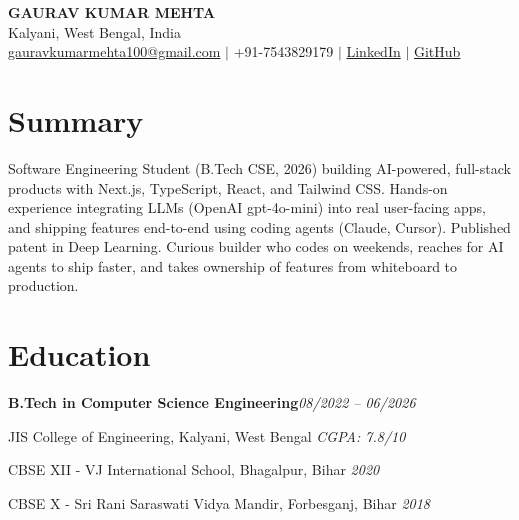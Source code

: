 \documentclass[a4paper,10pt]{article}
\newcommand{\role}[2]{%
  \noindent\textbf{#1}\hfill\textit{\small #2}\par\vspace{1pt}
}
\begin{document}
\begin{center}
    {\LARGE \textbf{GAURAV KUMAR MEHTA}}\\[2pt]
    {\small Kalyani, West Bengal, India}\\[2pt]
    {\small \href{mailto:gauravkumarmehta100@gmail.com}{gauravkumarmehta100@gmail.com} $\vert$
    +91-7543829179 $\vert$
    \href{https://www.linkedin.com/in/gauravkumarmehta}{LinkedIn} $\vert$
    \href{https://github.com/gaurav620}{GitHub}}
\end{center}

\section*{Summary}
Software Engineering Student (B.Tech CSE, 2026) building AI-powered, full-stack products with Next.js, TypeScript, React, and Tailwind CSS. Hands-on experience integrating LLMs (OpenAI gpt-4o-mini) into real user-facing apps, and shipping features end-to-end using coding agents (Claude, Cursor). Published patent in Deep Learning. Curious builder who codes on weekends, reaches for AI agents to ship faster, and takes ownership of features from whiteboard to production.

\section*{Education}
\role{B.Tech in Computer Science Engineering}{08/2022 -- 06/2026}
JIS College of Engineering, Kalyani, West Bengal \quad \textit{CGPA: 7.8/10}\par\vspace{1pt}
\noindent CBSE XII - VJ International School, Bhagalpur, Bihar \hfill \textit{2020}\par\vspace{1pt}
\noindent CBSE X - Sri Rani Saraswati Vidya Mandir, Forbesganj, Bihar \hfill \textit{2018}

\end{document}
